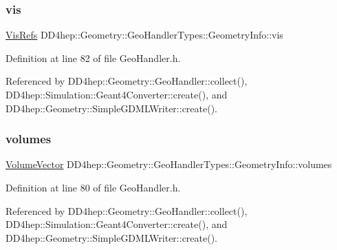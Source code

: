 \subsubsection{\texorpdfstring{vis}{vis}}
{\footnotesize\ttfamily \hyperlink{class_d_d4hep_1_1_geometry_1_1_geo_handler_types_abeb370eb52c06e48c61e6c8bc19b66ab}{Vis\+Refs} D\+D4hep\+::\+Geometry\+::\+Geo\+Handler\+Types\+::\+Geometry\+Info\+::vis}



Definition at line 82 of file Geo\+Handler.\+h.



Referenced by D\+D4hep\+::\+Geometry\+::\+Geo\+Handler\+::collect(), D\+D4hep\+::\+Simulation\+::\+Geant4\+Converter\+::create(), and D\+D4hep\+::\+Geometry\+::\+Simple\+G\+D\+M\+L\+Writer\+::create().

\hypertarget{class_d_d4hep_1_1_geometry_1_1_geo_handler_types_1_1_geometry_info_a67842e3e45b1330e99a86b794f3b9427}{}\label{class_d_d4hep_1_1_geometry_1_1_geo_handler_types_1_1_geometry_info_a67842e3e45b1330e99a86b794f3b9427} 
\subsubsection{\texorpdfstring{volumes}{volumes}}
{\footnotesize\ttfamily \hyperlink{class_d_d4hep_1_1_geometry_1_1_geo_handler_types_a6713619ef278692ebdf9f6ee4a3f32de}{Volume\+Vector} D\+D4hep\+::\+Geometry\+::\+Geo\+Handler\+Types\+::\+Geometry\+Info\+::volumes}



Definition at line 80 of file Geo\+Handler.\+h.



Referenced by D\+D4hep\+::\+Geometry\+::\+Geo\+Handler\+::collect(), D\+D4hep\+::\+Simulation\+::\+Geant4\+Converter\+::create(), and D\+D4hep\+::\+Geometry\+::\+Simple\+G\+D\+M\+L\+Writer\+::create().

\hypertarget{class_d_d4hep_1_1_geometry_1_1_geo_handler_types_1_1_geometry_info_ae40dd08f18b956caf35d7fda40a57528}{}\label{class_d_d4hep_1_1_geometry_1_1_geo_handler_types_1_1_geometry_info_ae40dd08f18b956caf35d7fda40a57528} 
